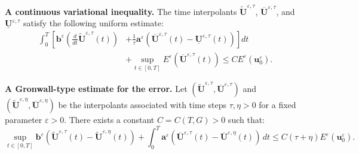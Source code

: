 \documentclass[a4paper,11pt]{article}
\theoremstyle{definition}
\numberwithin{equation}{section}
\newcommand{\e}{\varepsilon}
\begin{document}
\noindent \textbf{A continuous variational inequality.} The time interpolants $\widetilde{\mathbf{U}}^{\e, \tau}$, $\overline{\mathbf{U}}^{\e, \tau}$, and $\underline{\mathbf{U}}^{\e, \tau}$ satisfy the following uniform estimate:
\begin{equation}\label{continuous-stability-tilde}
	\begin{split}
		\int_0^T \left[ \mathbf{b}^\e\left(\frac{d}{dt} \widetilde{\mathbf{U}}^{\e, \tau}(t)\right)\right. &+\left. \frac{1}{\tau}\mathbf{a}^\e(\overline{\mathbf{U}}^{\e, \tau}(t) - \underline{\mathbf{U}}^{\e, \tau}(t)) \right] dt \\
		&+ \sup_{t \in [0,T]} E^\e(\overline{\mathbf{U}}^{\e, \tau}(t)) \le C E^\e(\mathbf{u}_0^\e).
	\end{split}
\end{equation}
\smallskip

\noindent \textbf{A Gronwall-type estimate for the error.} 
Let $(\widetilde{\mathbf{U}}^{\e, \tau}, \overline{\mathbf{U}}^{\e, \tau})$ and $(\widetilde{\mathbf{U}}^{\e, \eta}, \overline{\mathbf{U}}^{\e, \eta})$ be the interpolants associated with time steps $\tau, \eta > 0$ for a fixed parameter $\e > 0$. There exists a constant $C = C(T, G) > 0$ such that:
\begin{equation}
	\label{cauchy-estimate-knm}
	\sup_{t \in [0,T]} \mathbf{b}^\e(\widetilde{\mathbf{U}}^{\e, \tau}(t) - \widetilde{\mathbf{U}}^{\e, \eta}(t)) + \int_0^T \mathbf{a}^\e(\overline{\mathbf{U}}^{\e, \tau}(t) - \overline{\mathbf{U}}^{\e, \eta}(t)) \, dt \le C(\tau + \eta) E^\e(\mathbf{u}_0^\e).
\end{equation}
\end{document}
